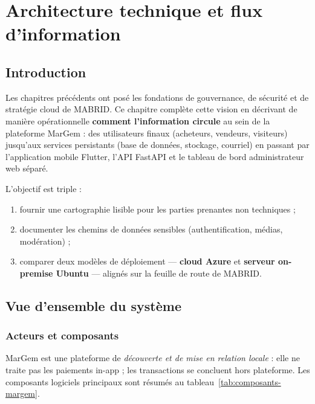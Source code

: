 \chapter{Architecture technique et flux d'information}
\label{ch:flux}

\section{Introduction}

Les chapitres précédents ont posé les fondations de gouvernance, de sécurité et de stratégie cloud de MABRID. Ce chapitre complète cette vision en décrivant de manière opérationnelle \textbf{comment l'information circule} au sein de la plateforme MarGem : des utilisateurs finaux (acheteurs, vendeurs, visiteurs) jusqu'aux services persistants (base de données, stockage, courriel) en passant par l'application mobile Flutter, l'API FastAPI et le tableau de bord administrateur web séparé.

L'objectif est triple :
\begin{enumerate}
  \item fournir une cartographie lisible pour les parties prenantes non techniques ;
  \item documenter les chemins de données sensibles (authentification, médias, modération) ;
  \item comparer deux modèles de déploiement --- \textbf{cloud Azure} et \textbf{serveur on-premise Ubuntu} --- alignés sur la feuille de route de MABRID.
\end{enumerate}

\section{Vue d'ensemble du système}

\subsection{Acteurs et composants}

MarGem est une plateforme de \emph{découverte et de mise en relation locale} : elle ne traite pas les paiements in-app ; les transactions se concluent hors plateforme. Les composants logiciels principaux sont résumés au tableau~\ref{tab:composants-margem}.

